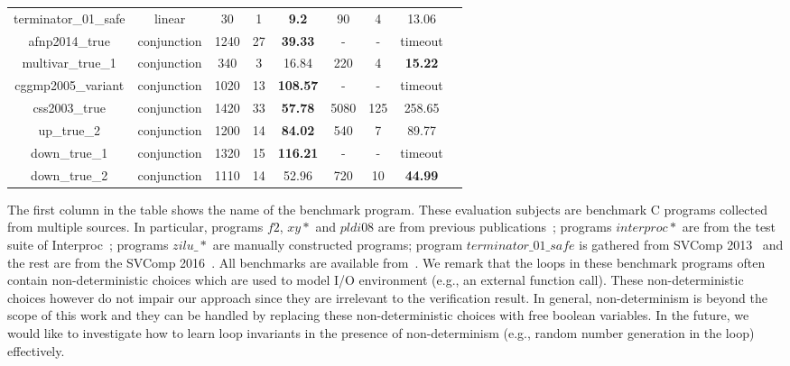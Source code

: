 \begin{table}[t]
\begin{tabular}{l c | c c c | c c c | c }
\multicolumn{1}{|c|}{terminator\_01\_safe}         		&linear 		&30 &1 &\textbf{9.2}  			&90  &4  &13.06  			&\multicolumn{1}{|c|}{\cmark} \\
\multicolumn{1}{|c|}{afnp2014\_true}         			&conjunction	&1240 &27 &\textbf{39.33}		&- &- &timeout  		&\multicolumn{1}{|c|}{\xmark} \\
\multicolumn{1}{|c|}{multivar\_true\_1}         		&conjunction 	&340 &3 &16.84  				&220 &4   &\textbf{15.22}  	&\multicolumn{1}{|c|}{\cmark} \\
\multicolumn{1}{|c|}{cggmp2005\_variant}   				&conjunction 	&1020 &13 &\textbf{108.57}		&- &- &timeout  		&\multicolumn{1}{|c|}{\cmark} \\
\multicolumn{1}{|c|}{css2003\_true}         			&conjunction 	&1420 &33 &\textbf{57.78}		&5080 &125 &258.65  		&\multicolumn{1}{|c|}{\cmark} \\
\multicolumn{1}{|c|}{up\_true\_2}         				&conjunction 	&1200 &14 &\textbf{84.02}  		&540 &7   &89.77  			&\multicolumn{1}{|c|}{\cmark} \\
\multicolumn{1}{|c|}{down\_true\_1}         			&conjunction 	&1320  &15 &\textbf{116.21}  	&-  &-  &timeout  		&\multicolumn{1}{|c|}{\cmark} \\
\multicolumn{1}{|c|}{down\_true\_2}         			&conjunction 	&1110 &14 &52.96  				&720 &10   &\textbf{44.99}  &\multicolumn{1}{|c|}{\cmark} \\

\hline
\end{tabular}
\label{tbl:stats}
\end{table}

The first column in the table shows the name of the benchmark program. These evaluation subjects are benchmark C programs collected from multiple sources. In particular, programs $f2$, $xy*$ and $pldi08$ are from previous publications~\cite{gulwani2008program,sharma2012interpolants,gulavani2008automatically}; programs $interproc*$ are from the test suite of Interproc~\cite{jeannet2010interproc}; programs $zilu\_*$ are manually constructed programs; program $terminator\_01\_safe$ is gathered from SVComp 2013~\cite{beyer:SVCOMP:2013} and the rest are from the SVComp 2016~\cite{Dirk:SVCOMP:2016}. All benchmarks are available from~\cite{zilu:benchmark}.
We remark that the loops in these benchmark programs often contain non-deterministic choices
which are used to model I/O environment (e.g., an external function call). These non-deterministic choices however do not impair our approach since they are irrelevant to the verification result.
In general, non-determinism is beyond the scope of this work and they can be handled by replacing these non-deterministic choices with free boolean variables. In the future, we would like to investigate how to learn loop invariants in the presence of non-determinism (e.g., random number generation in the loop) effectively.

